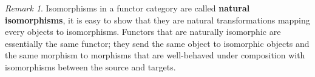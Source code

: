 \documentclass{article}
\newtheorem{prop}[thm]{Proposition}
\theoremstyle{definition}
\theoremstyle{remark}
\newtheorem{rem}[thm]{Remark}
\begin{document}
\begin{rem}
	Isomorphisms in a functor category are called \textbf{natural isomorphisms}, it is easy to show that they are natural transformations mapping every objects to isomorphisms. Functors that are naturally isomorphic are essentially the same functor; they send the same object to isomorphic objects and the same morphism to morphisms that are well-behaved under composition with isomorphisms between the source and targets.
\end{rem}

%	
\end{document}
